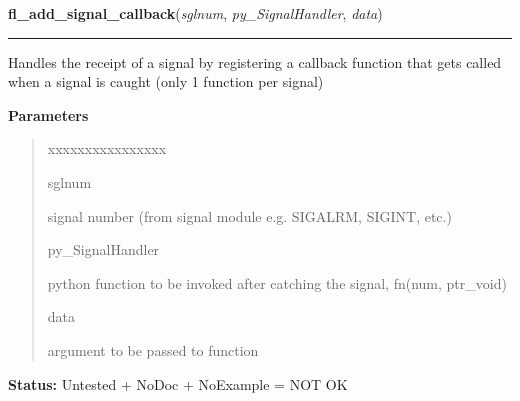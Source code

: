     \vspace{0.5ex}

\hspace{.8\funcindent}\begin{boxedminipage}{\funcwidth}

    \raggedright \textbf{fl\_add\_signal\_callback}(\textit{sglnum}, \textit{py\_SignalHandler}, \textit{data})

    \vspace{-1.5ex}

    \rule{\textwidth}{0.5\fboxrule}
\setlength{\parskip}{2ex}
    Handles the receipt of a signal by registering a callback function that
    gets called when a signal is caught (only 1 function per signal)

\setlength{\parskip}{1ex}
      \textbf{Parameters}
      \vspace{-1ex}

      \begin{quote}
        \begin{Ventry}{xxxxxxxxxxxxxxxx}

          \item[sglnum]

          signal number (from signal module e.g. SIGALRM, SIGINT, etc.)

          \item[py\_SignalHandler]

          python function to be invoked after catching the signal, fn(num, 
          ptr\_void)

          \item[data]

          argument to be passed to function

        \end{Ventry}

      \end{quote}

\textbf{Status:} Untested + NoDoc + NoExample = NOT OK



    \end{boxedminipage}

    \label{xformslib:library:fl_remove_signal_callback}

    \vspace{0.5ex}

